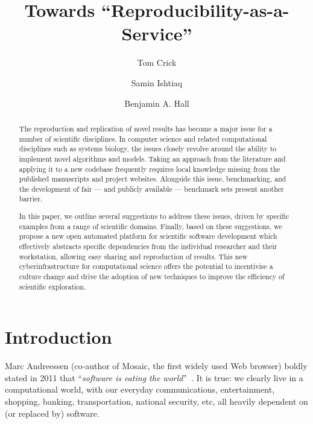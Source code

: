 \documentclass[a4paper,11pt]{article}
\title{Towards ``Reproducibility-as-a-Service''}
\author[1]{Tom Crick}
\author[2]{Samin Ishtiaq}
\author[3]{Benjamin A. Hall}
\affil[1]{Department of Computing \& Information Systems, Cardiff
  Metropolitan University, UK}
\affil[2]{Microsoft Research Cambridge, UK}
\affil[3]{MRC Cancer Unit, University of Cambridge, UK}
\affil[1]{\protect\url{tcrick@cardiffmet.ac.uk}}
\affil[2]{\protect\url{samin.ishtiaq@microsoft.com}}
\affil[3]{\protect\url{bh418@mrc-cu.cam.ac.uk}}
\date{ }
\begin{document}
\maketitle



\begin{abstract}
The reproduction and replication of novel results has become a major
issue for a number of scientific disciplines. In computer science and
related computational disciplines such as systems biology, the issues
closely revolve around the ability to implement novel algorithms and
models. Taking an approach from the literature and applying it to a
new codebase frequently requires local knowledge missing from the
published manuscripts and project websites. Alongside this issue,
benchmarking, and the development of fair --- and publicly available
--- benchmark sets present another barrier.

In this paper, we outline several suggestions to address these issues,
driven by specific examples from a range of scientific domains.
Finally, based on these suggestions, we propose a new open automated
platform for scientific software development which effectively
abstracts specific dependencies from the individual researcher and
their workstation, allowing easy sharing and reproduction of
results. This new cyberinfrastructure for computational science offers
the potential to incentivise a culture change and drive the adoption
of new techniques to improve the efficiency of scientific exploration.
\end{abstract}

\section{Introduction}

Marc Andreessen (co-author of Mosaic, the first widely used Web
browser) boldly stated in 2011 that ``{\emph{software is eating the
world}}''~\cite{andreessen:2011}. It is true: we clearly live in a
computational world, with our everyday communications, entertainment,
shopping, banking, transportation, national security, etc, all heavily
dependent on (or replaced by) software.
\end{document}
